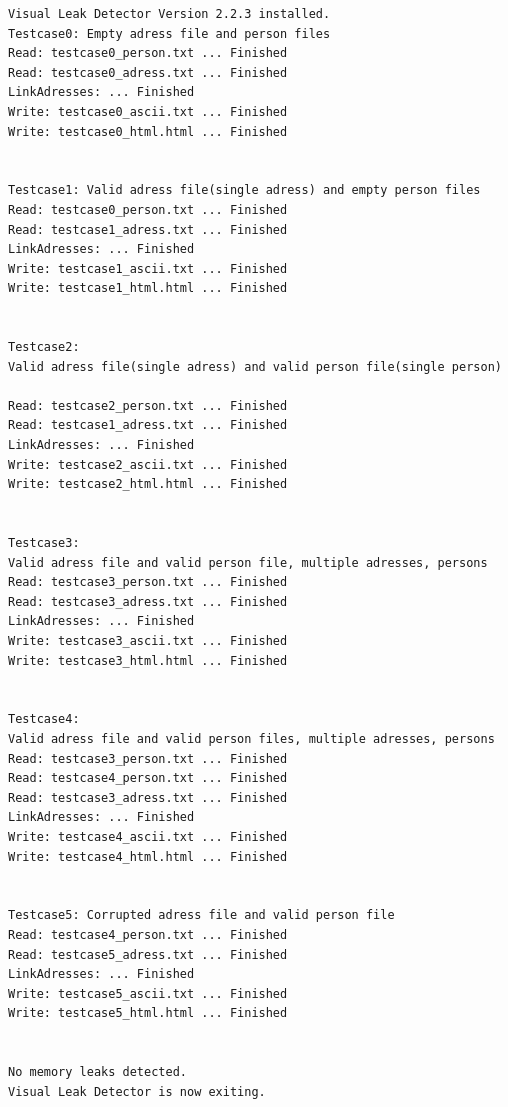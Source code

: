 \documentclass[12pt,a4paper]{article}
\begin{document}
\begin {verbatim}
Visual Leak Detector Version 2.2.3 installed.
Testcase0: Empty adress file and person files
Read: testcase0_person.txt ... Finished
Read: testcase0_adress.txt ... Finished
LinkAdresses: ... Finished
Write: testcase0_ascii.txt ... Finished
Write: testcase0_html.html ... Finished


Testcase1: Valid adress file(single adress) and empty person files
Read: testcase0_person.txt ... Finished
Read: testcase1_adress.txt ... Finished
LinkAdresses: ... Finished
Write: testcase1_ascii.txt ... Finished
Write: testcase1_html.html ... Finished


Testcase2: 
Valid adress file(single adress) and valid person file(single person)

Read: testcase2_person.txt ... Finished
Read: testcase1_adress.txt ... Finished
LinkAdresses: ... Finished
Write: testcase2_ascii.txt ... Finished
Write: testcase2_html.html ... Finished


Testcase3: 
Valid adress file and valid person file, multiple adresses, persons
Read: testcase3_person.txt ... Finished
Read: testcase3_adress.txt ... Finished
LinkAdresses: ... Finished
Write: testcase3_ascii.txt ... Finished
Write: testcase3_html.html ... Finished


Testcase4: 
Valid adress file and valid person files, multiple adresses, persons
Read: testcase3_person.txt ... Finished
Read: testcase4_person.txt ... Finished
Read: testcase3_adress.txt ... Finished
LinkAdresses: ... Finished
Write: testcase4_ascii.txt ... Finished
Write: testcase4_html.html ... Finished


Testcase5: Corrupted adress file and valid person file
Read: testcase4_person.txt ... Finished
Read: testcase5_adress.txt ... Finished
LinkAdresses: ... Finished
Write: testcase5_ascii.txt ... Finished
Write: testcase5_html.html ... Finished


No memory leaks detected.
Visual Leak Detector is now exiting.
\end {verbatim}
\end{document}
